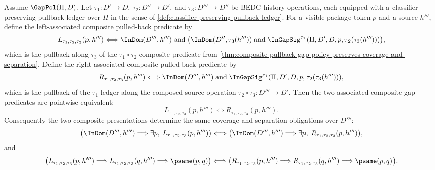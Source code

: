 \begin{theorem}
\label{thm:pullback-gap-policy-composition-associativity}
Assume $\GapPol(\Pi,D)$. Let $\tau_1:D'\to D$, $\tau_2:D''\to D'$, and $\tau_3:D'''\to D''$ be BEDC history operations, each equipped with a classifier-preserving pullback ledger over $\Pi$ in the sense of \autoref{def:classifier-preserving-pullback-ledger}. For a visible package token $p$ and a source $h'''$, define the left-associated composite pulled-back predicate by
$$
  L_{\tau_1,\tau_2,\tau_3}(p,h''')
  \Longleftrightarrow
  \InDom(D''',h''')\;\text{and}\;
  \bigl(\InDom(D'',\tau_3(h'''))\;\text{and}\;
  {\InGapSig}^{\tau_1}(\Pi,D',D,p,\tau_2(\tau_3(h''')))\bigr),
$$
which is the pullback along $\tau_3$ of the $\tau_1\circ\tau_2$ composite predicate from \autoref{thm:composite-pullback-gap-policy-preserves-coverage-and-separation}. Define the right-associated composite pulled-back predicate by
$$
  R_{\tau_1,\tau_2,\tau_3}(p,h''')
  \Longleftrightarrow
  \InDom(D''',h''')\;\text{and}\;
  {\InGapSig}^{\tau_1}(\Pi,D',D,p,\tau_2(\tau_3(h'''))),
$$
which is the pullback of the $\tau_1$-ledger along the composed source operation $\tau_2\circ\tau_3:D'''\to D'$. Then the two associated composite gap predicates are pointwise equivalent:
$$
  L_{\tau_1,\tau_2,\tau_3}(p,h''')
  \Longleftrightarrow
  R_{\tau_1,\tau_2,\tau_3}(p,h''').
$$
Consequently the two composite presentations determine the same coverage and separation obligations over $D'''$:
$$
  \bigl(\InDom(D''',h''')\Longrightarrow
  \exists p,\;L_{\tau_1,\tau_2,\tau_3}(p,h''')\bigr)
  \Longleftrightarrow
  \bigl(\InDom(D''',h''')\Longrightarrow
  \exists p,\;R_{\tau_1,\tau_2,\tau_3}(p,h''')\bigr),
$$
and
$$
  \bigl(L_{\tau_1,\tau_2,\tau_3}(p,h''')
  \Longrightarrow
  L_{\tau_1,\tau_2,\tau_3}(q,h''')
  \Longrightarrow
  \psame(p,q)\bigr)
  \Longleftrightarrow
  \bigl(R_{\tau_1,\tau_2,\tau_3}(p,h''')
  \Longrightarrow
  R_{\tau_1,\tau_2,\tau_3}(q,h''')
  \Longrightarrow
  \psame(p,q)\bigr).
$$
\end{theorem}

